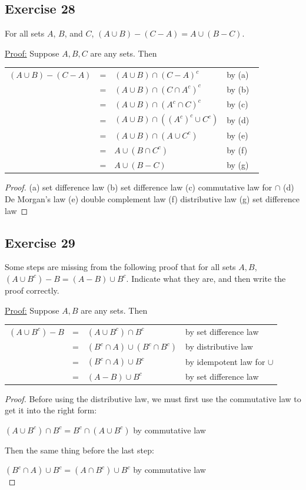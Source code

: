 \documentclass[14pt]{extarticle}
\newcommand{\fbl}{\underline{\hspace{1cm}}\,\,}
\newcommand{\cy}{\color{cyan}}
\begin{document}
\subsection{Exercise 28}
For all sets $A$, $B$, and $C$, \((A \cup B) - (C - A) = A \cup (B - C)\).

\underline{Proof:} Suppose $A,B,C$ are any sets. Then

\begin{tabular}{rcll}
\((A \cup B) - (C - A)\) & = & \((A \cup B) \cap (C - A)^c\) & by (a) \fbl \\
& = & \((A \cup B) \cap (C \cap A^c)^c\) & by (b) \fbl \\
& = & \((A \cup B) \cap (A^c \cap C)^c\) & by (c) \fbl \\
& = & \((A \cup B)\cap((A^c)^c \cup C^c)\) & by (d) \fbl \\
& = & \((A \cup B) \cap (A \cup C^c)\) & by (e) \fbl \\
& = & \(A \cup (B \cap C^c)\) & by (f) \fbl \\
& = & \(A \cup (B - C)\) & by (g) \fbl
\end{tabular}

\begin{proof}
(a) set difference law (b) set difference law (c) commutative law for $\cap$ (d) De Morgan’s law 
(e) double complement law (f) distributive law (g) set difference law
\end{proof}

\subsection{Exercise 29}
Some steps are missing from the following proof that for all sets $A,B$, \((A \cup B^c) - B = (A - B) \cup B^c\). 
Indicate what they are, and then write the proof correctly.

\underline{Proof:} Suppose $A,B$ are any sets. Then
\begin{center}
\begin{tabular}{rcll}
\((A \cup B^c) - B\) & = & \((A \cup B^c) \cap B^c\) & {\cy by set difference law} \\
& = & \((B^c \cap A) \cup (B^c \cap B^c)\) & {\cy by distributive law} \\
& = & \((B^c \cap A) \cup B^c\) & {\cy by idempotent law for $\cup$} \\
& = & \((A-B) \cup B^c\) & {\cy by set difference law}
\end{tabular}
\end{center}
\begin{proof}
Before using the distributive law, we must first use the commutative law to get it into the right form:

\((A \cup B^c) \cap B^c = B^c \cap (A \cup B^c)\) {\cy by commutative law}

Then the same thing before the last step:

\((B^c \cap A) \cup B^c = (A \cap B^c) \cup B^c\) {\cy by commutative law} \\
\end{proof}
\end{document}
